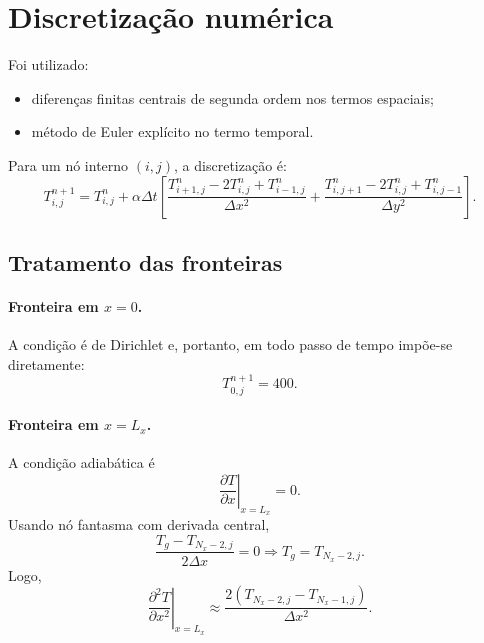 \documentclass[12pt,a4paper]{article}
\begin{document}
\section{Discretização numérica}
Foi utilizado:
\begin{itemize}
    \item diferenças finitas centrais de segunda ordem nos termos espaciais;
    \item método de Euler explícito no termo temporal.
\end{itemize}

Para um nó interno $(i,j)$, a discretização é:
\begin{equation}
T_{i,j}^{n+1} = T_{i,j}^{n} + \alpha\Delta t
\left[
\frac{T_{i+1,j}^{n}-2T_{i,j}^{n}+T_{i-1,j}^{n}}{\Delta x^2}
+
\frac{T_{i,j+1}^{n}-2T_{i,j}^{n}+T_{i,j-1}^{n}}{\Delta y^2}
\right].
\end{equation}

\subsection{Tratamento das fronteiras}
\paragraph{Fronteira em $x=0$.}
A condição é de Dirichlet e, portanto, em todo passo de tempo impõe-se diretamente:
\begin{equation}
T_{0,j}^{n+1}=400.
\end{equation}

\paragraph{Fronteira em $x=L_x$.}
A condição adiabática é
\begin{equation}
\left.\frac{\partial T}{\partial x}\right|_{x=L_x}=0.
\end{equation}
Usando nó fantasma com derivada central,
\begin{equation}
\frac{T_g-T_{N_x-2,j}}{2\Delta x}=0 \Rightarrow T_g=T_{N_x-2,j}.
\end{equation}
Logo,
\begin{equation}
\left.\frac{\partial^2 T}{\partial x^2}\right|_{x=L_x}
\approx
\frac{2(T_{N_x-2,j}-T_{N_x-1,j})}{\Delta x^2}.
\end{equation}
\end{document}
